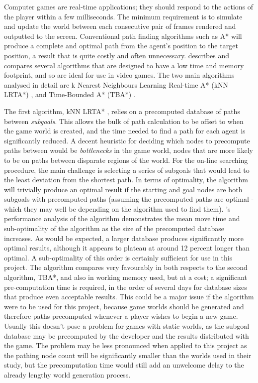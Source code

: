 \documentclass[a4paper,12pt]{article}
\begin{document}
Computer games are real-time applications; they should respond to the actions of the player within a few milliseconds. The minimum requirement is to simulate and update the world between each consecutive pair of frames rendered and outputted to the screen. Conventional path finding algorithms such as A* \cite{hart68} will produce a complete and optimal path from the agent's position to the target position, a result that is quite costly and often unnecessary.  describes and compares several algorithms that are designed to have a low time and memory footprint, and so are ideal for use in video games. The two main algorithms analysed in detail are k Nearest Neighbours Learning Real-time A* (kNN LRTA*) \cite{bulitko09}, and Time-Bounded A* (TBA*) \cite{bjornsson09}.

The first algorithm, kNN LRTA* \cite{bulitko09}, relies on a precomputed database of paths between \emph{subgoals}. This allows the bulk of path calculation to be offset to when the game world is created, and the time needed to find a path for each agent is significantly reduced. A decent heuristic for deciding which nodes to precompute paths between would be \emph{bottlenecks} in the game world, nodes that are more likely to be on paths between disparate regions of the world. For the on-line searching procedure, the main challenge is selecting a series of subgoals that would lead to the least deviation from the shortest path. In terms of optimality, the algorithm will trivially produce an optimal result if the starting and goal nodes are both subgoals with precomputed paths (assuming the precomputed paths are optimal - which they may well be depending on the algorithm used to find them). 's performance analysis of the algorithm demonstrates the mean move time and sub-optimality of the algorithm as the size of the precomputed database increases. As would be expected, a larger database produces significantly more optimal results, although it appears to plateau at around 12 percent longer than optimal. A sub-optimality of this order is certainly sufficient for use in this project. The algorithm compares very favourably in both respects to the second algorithm, TBA*, and also in working memory used, but at a cost; a significant pre-computation time is required, in the order of several days for database sizes that produce even acceptable results. This could be a major issue if the algorithm were to be used for this project, because game worlds should be generated and therefore paths precomputed whenever a player wishes to begin a new game. Usually this doesn't pose a problem for games with static worlds, as the subgoal database may be precomputed by the developer and the results distributed with the game. The problem may be less pronounced when applied to this project as the pathing node count will be significantly smaller than the worlds used in their study, but the precomputation time would still add an unwelcome delay to the already lengthy world generation process.
\end{document}
